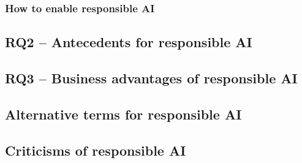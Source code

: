
\subsubsection{How to enable responsible AI}

\subsection{RQ2 -- Antecedents for responsible AI}
\label{sec:results-rq2:antecedents}

\subsection{RQ3 -- Business advantages of responsible AI}
\label{sec:results-rq3:advantages}



\subsection{Alternative terms for responsible AI}
\label{sec:results-alernative-terms}

\subsection{Criticisms of responsible AI}
\label{sec:results-criticism}
